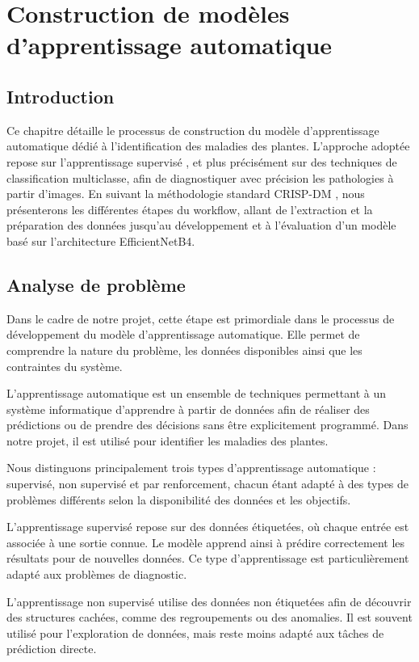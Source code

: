 \chapter{Construction de modèles d'apprentissage automatique}

\section*{Introduction}
Ce chapitre détaille le processus de construction du modèle d'apprentissage automatique dédié à l'identification des maladies des plantes. L'approche adoptée repose sur l'apprentissage supervisé , et plus précisément sur des techniques de classification multiclasse, afin de diagnostiquer avec précision les pathologies à partir d'images. En suivant la méthodologie standard CRISP-DM , nous présenterons les différentes étapes du workflow, allant de l'extraction et la préparation des données jusqu'au développement et à l'évaluation d'un modèle basé sur l'architecture EfficientNetB4.
\section{Analyse de problème}

Dans le cadre de notre projet, cette étape est primordiale dans le processus de développement du modèle d'apprentissage automatique. Elle permet de comprendre la nature du problème, les données disponibles ainsi que les contraintes du système.

L'apprentissage automatique est un ensemble de techniques permettant à un système informatique d'apprendre à partir de données afin de réaliser des prédictions ou de prendre des décisions sans être explicitement programmé. Dans notre projet, il est utilisé pour identifier les maladies des plantes.

Nous distinguons principalement trois types d'apprentissage automatique : supervisé, non supervisé et par renforcement, chacun étant adapté à des types de problèmes différents selon la disponibilité des données et les objectifs.

L'apprentissage supervisé repose sur des données étiquetées, où chaque entrée est associée à une sortie connue. Le modèle apprend ainsi à prédire correctement les résultats pour de nouvelles données. Ce type d'apprentissage est particulièrement adapté aux problèmes de diagnostic.

L'apprentissage non supervisé utilise des données non étiquetées afin de découvrir des structures cachées, comme des regroupements ou des anomalies. Il est souvent utilisé pour l'exploration de données, mais reste moins adapté aux tâches de prédiction directe.


